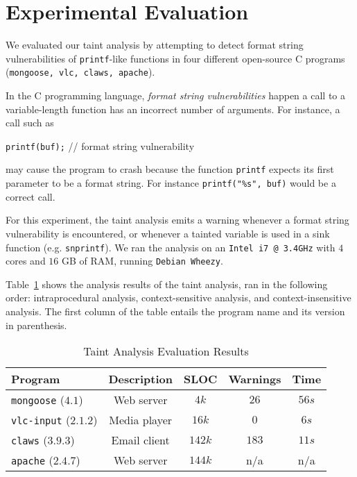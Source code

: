 \section{Experimental Evaluation}\label{sec:evaluation}
We evaluated our taint analysis by attempting to detect
format string vulnerabilities of \texttt{printf}-like functions
in four different open-source C programs ({\tt mongoose, vlc,
claws, apache}). 

In the C programming language, \textit{format string vulnerabilities}
happen a call to a variable-length function has an incorrect number
of arguments. For instance, a call such as
\begin{center}
{\tt printf(buf);} // format string vulnerability
\end{center}
may cause the program to crash because the function \texttt{printf}
expects its first parameter to be a format string. For
instance {\tt printf("\%s", buf)} would be a correct call.

For this experiment, the taint analysis emits a warning
whenever a format string vulnerability is encountered,
or whenever a tainted variable is used in a sink function
(e.g. \texttt{snprintf}).
We ran the analysis on an \texttt{Intel i7 @ 3.4GHz} with
$4$ cores and $16$ GB of RAM, running {\tt Debian Wheezy}.

Table~\ref{tab:results} shows the analysis results of the
taint analysis, ran in the following order: intraprocedural
analysis, context-sensitive analysis, and context-insensitive
analysis.
The first column of the table entails the program name and
its version in parenthesis.
\begin{table}[!hbtp]
\centering
\begin{tabular}{|l|c|c|c|c|}
\hline
{\bf Program}				&	{\bf Description}	&	{\bf SLOC}	& {\bf Warnings}	&	{\bf Time}	\\ \hline
{\tt mongoose}	($4.1$)		&	Web server			&	$4k$		&	$26$			&	$56s$ 	\\ %
{\tt vlc-input}	($2.1.2$)		&	Media player		&	$16k$		&	$0$				&	$6s$ 	\\ %
{\tt claws}		($3.9.3$)	&	Email client		& 	$142k$ 		&	$183$			&	$11s$		\\ %
{\tt apache}	($2.4.7$)	&	Web server			&	$144k$		&	n/a				&	n/a	 		\\ \hline
\end{tabular}\caption{Taint Analysis Evaluation Results}\label{tab:results}
\end{table}

